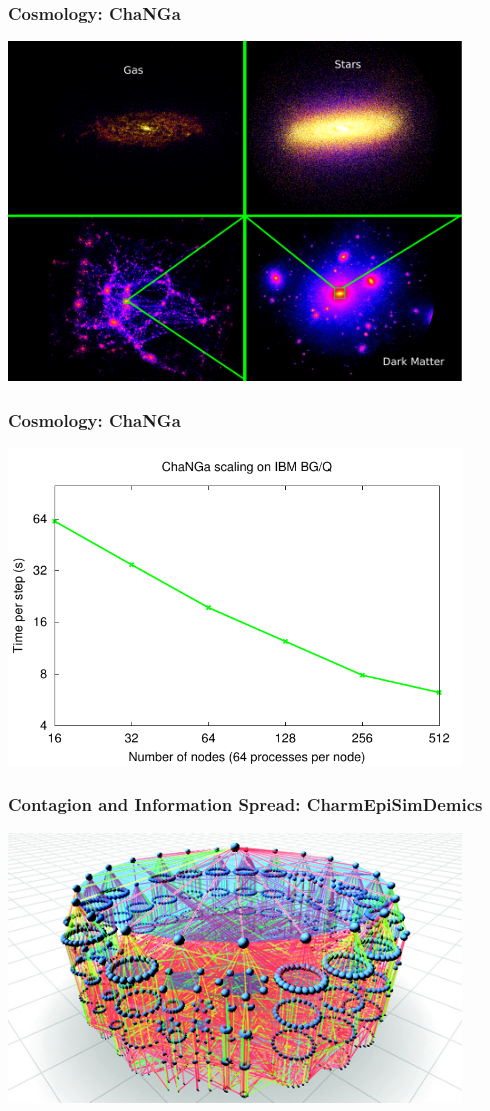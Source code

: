 \begin{frame}
\frametitle{Cosmology: ChaNGa}
\includegraphics[width=0.9\textwidth]{../figures/changa-length-scales.pdf}
\end{frame}


\begin{frame}
\frametitle{Cosmology: ChaNGa}
\includegraphics[width=0.9\textwidth]{../figures/changa-scaling.pdf}
\end{frame}


\begin{frame}
\frametitle{Contagion and Information Spread: CharmEpiSimDemics}
\includegraphics[width=0.9\textwidth]{../figures/contagion.png}
\end{frame}


